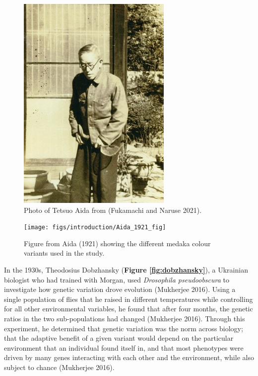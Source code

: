 \documentclass[
]{book}
\begin{document}
\begin{figure}

\hfill{}\includegraphics[width=1\linewidth]{figs/introduction/Aida} 

\caption{Photo of Tetsuo Aida from (Fukamachi and Naruse 2021).}\label{fig:aida}
\end{figure}



\begin{figure}
\texttt{[image: figs/introduction/Aida\_1921\_fig]} \caption{Figure from Aida (1921) showing the different medaka colour variants used in the study.}\label{fig:aida-fig}
\end{figure}

In the 1930s, Theodosius Dobzhansky (\textbf{Figure \ref{fig:dobzhansky}}), a Ukrainian biologist who had trained with Morgan, used \emph{Drosophila pseudoobscura} to investigate how genetic variation drove evolution (Mukherjee 2016). Using a single population of flies that he raised in different temperatures while controlling for all other environmental variables, he found that after four months, the genetic ratios in the two sub-populations had changed (Mukherjee 2016). Through this experiment, he determined that genetic variation was the norm across biology; that the adaptive benefit of a given variant would depend on the particular environment that an individual found itself in, and that most phenotypes were driven by many genes interacting with each other and the environment, while also subject to chance (Mukherjee 2016).
\end{document}
